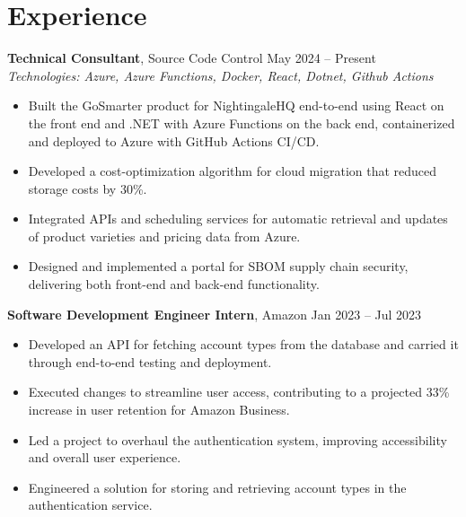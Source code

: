 \documentclass[11pt,a4paper]{article}
\begin{document}
\section{Experience}
\textbf{Technical Consultant}, Source Code Control \hfill May 2024 -- Present
\\ \textit{Technologies: Azure, Azure Functions, Docker, React, Dotnet, Github Actions}
\begin{itemize}
  \item Built the GoSmarter product for NightingaleHQ end-to-end using React on the front end and .NET with Azure Functions on the back end, containerized and deployed to Azure with GitHub Actions CI/CD.
  \item Developed a cost-optimization algorithm for cloud migration that reduced storage costs by 30\%.
  \item Integrated APIs and scheduling services for automatic retrieval and updates of product varieties and pricing data from Azure.
  \item Designed and implemented a portal for SBOM supply chain security, delivering both front-end and back-end functionality.
\end{itemize}
\vspace{2pt}
\textbf{Software Development Engineer Intern}, Amazon \hfill Jan 2023 -- Jul 2023
\begin{itemize}
  \item Developed an API for fetching account types from the database and carried it through end-to-end testing and deployment.
  \item Executed changes to streamline user access, contributing to a projected 33\% increase in user retention for Amazon Business.
  \item Led a project to overhaul the authentication system, improving accessibility and overall user experience.
  \item Engineered a solution for storing and retrieving account types in the authentication service.
\end{itemize}
\vspace{2pt}
\end{document}
